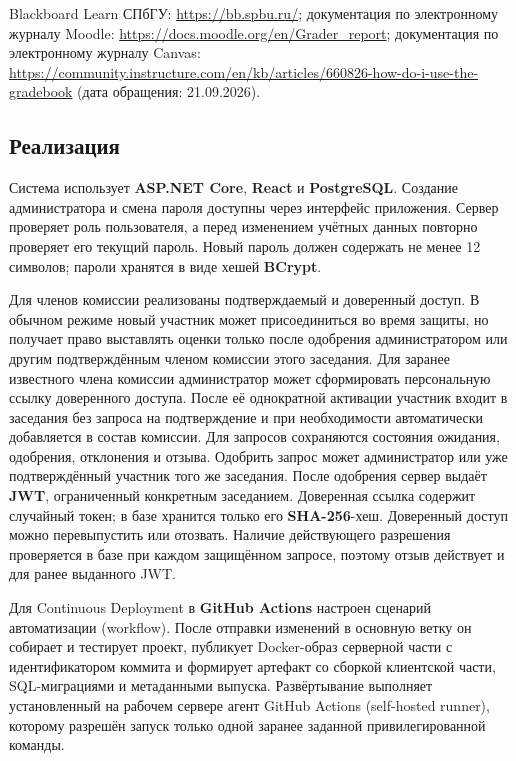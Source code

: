 \documentclass[a4paper]{article}
\begin{document}
Blackboard Learn СПбГУ:
\url{https://bb.spbu.ru/};
документация по электронному журналу Moodle:
\url{https://docs.moodle.org/en/Grader_report};
документация по электронному журналу Canvas:
\url{https://community.instructure.com/en/kb/articles/660826-how-do-i-use-the-gradebook}
(дата обращения: 21.09.2026).

\subsection*{Реализация}

Система использует \textbf{ASP.NET Core}, \textbf{React} и
\textbf{PostgreSQL}. Создание администратора и смена пароля доступны через
интерфейс приложения. Сервер проверяет роль пользователя, а перед изменением
учётных данных повторно проверяет его текущий пароль. Новый пароль должен
содержать не менее 12 символов; пароли хранятся в виде хешей \textbf{BCrypt}.

Для членов комиссии реализованы подтверждаемый и доверенный доступ. В обычном режиме новый участник может присоединиться во время защиты, но получает право выставлять оценки только после одобрения администратором или другим подтверждённым членом комиссии этого заседания. Для заранее известного члена
комиссии администратор может сформировать персональную ссылку доверенного
доступа. После её однократной активации участник входит в заседания без запроса
на подтверждение и при необходимости автоматически добавляется в состав
комиссии. Для запросов сохраняются состояния ожидания, одобрения, отклонения и
отзыва. Одобрить запрос может администратор или уже подтверждённый участник
того же заседания. После одобрения сервер выдаёт \textbf{JWT}, ограниченный
конкретным заседанием. Доверенная ссылка содержит случайный токен; в базе
хранится только его \textbf{SHA-256}-хеш. Доверенный доступ можно перевыпустить
или отозвать. Наличие действующего разрешения проверяется в базе при каждом
защищённом запросе, поэтому отзыв действует и для ранее выданного JWT.

Для Continuous Deployment в \textbf{GitHub Actions} настроен сценарий
автоматизации (workflow). После отправки изменений в основную ветку он собирает
и тестирует проект, публикует Docker-образ серверной части с идентификатором
коммита и формирует артефакт со сборкой клиентской части, SQL-миграциями и
метаданными выпуска. Развёртывание выполняет установленный на рабочем сервере
агент GitHub Actions (self-hosted runner), которому разрешён запуск только одной
заранее заданной привилегированной команды.
\end{document}
